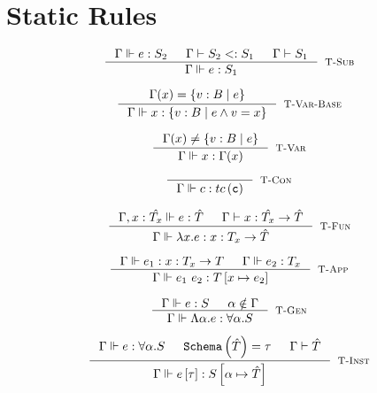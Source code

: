 \section*{Static Rules}

\hfill{}


$$
\inference{
	\hastype{\Gamma}{e}{S_2} && \isSub{\Gamma}{S_2}{S_1}
	&& \isWellFormed{\Gamma}{S_1}
}{
	\hastype{\Gamma}{e}{S_1}
}[\tsub]
$$

$$
\inference{
	\Gamma(x) = \tref{B}{e}
}{
	\hastype{\Gamma}{x}{\tref{B}{e \land \vref = x}}
}[\rulename{T-Var-Base}]
$$

$$
\inference{
	\Gamma(x) \neq \tref{B}{e}
}{
	\hastype{\Gamma}{x}{\Gamma(x)}
}[\rulename{T-Var}]
$$

$$
\inference{
}{
	\hastype{\Gamma}{c}{\tc{c}}
}[\tconst]
$$

$$
\inference{
	\hastype{\Gamma, x : \hat{T_x}}{e}{\hat{T}} 
	&& \isWellFormed{\Gamma}{\tfun{x}{\hat{T_x}}{\hat{T}}}
}{
	\hastype{\Gamma}{\efun{x}{e}}{\tfun{x}{{T_x}}{\hat{T}}}
}[\rulename{T-Fun}]
$$

$$\label{tapp}
\inference{
	\hastype{\Gamma}{e_1}{\tfun{x}{T_x}{T}} && 
	\hastype{\Gamma}{e_2}{T_x}
}{
	\hastype{\Gamma}{\eapp{e_1}{e_2}}{T\sub{x}{e_2}}
}[\tapp]
$$


$$
\inference{
	\hastype{\Gamma}{e}{S} && 
	\alpha \notin \Gamma
}{
	\hastype{\Gamma}{\etabs{\alpha}{e}}{\ttabs{\alpha}{S}}
}[\tgen]
$$

$$
\inference{
	\hastype{\Gamma}{e}{\ttabs{\alpha}{S}} && 
	\sch{\hat{T}} = \tau && \isWellFormed{\Gamma}{\hat{T}}
}{
	\hastype{\Gamma}{\etapp{e}{\tau}}{S\sub{\alpha}{\hat{T}}}
}[\tinst]
$$


